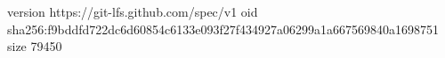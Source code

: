 version https://git-lfs.github.com/spec/v1
oid sha256:f9bddfd722dc6d60854c6133e093f27f434927a06299a1a667569840a1698751
size 79450
